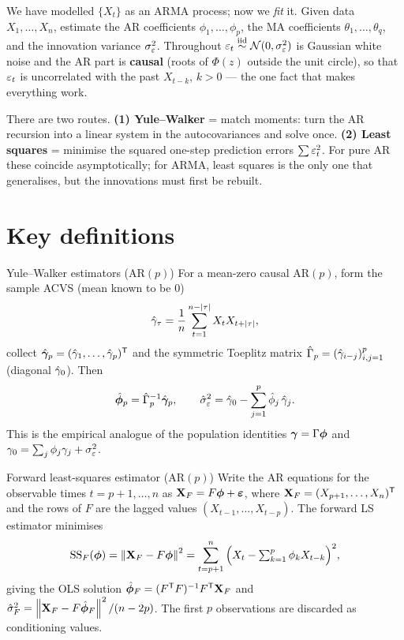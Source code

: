 \documentclass[11pt]{article}
\begin{document}

We have modelled $\{X_t\}$ as an ARMA process; now we \emph{fit} it. Given data $X_1,\dots,X_n$, estimate the AR coefficients $\phi_1,\dots,\phi_p$, the MA coefficients $\theta_1,\dots,\theta_q$, and the innovation variance $\sigma_\varepsilon^2$. Throughout $\varepsilon_t\overset{\text{iid}}{\sim}\mathcal N(0,\sigma_\varepsilon^2)$ is Gaussian white noise and the AR part is \textbf{causal} (roots of $\Phi(z)$ outside the unit circle), so that $\varepsilon_t$ is uncorrelated with the past $X_{t-k}$, $k>0$ --- the one fact that makes everything work.

\begin{intu}
There are two routes. \textbf{(1) Yule--Walker} = match moments: turn the AR recursion into a linear system in the autocovariances and solve once. \textbf{(2) Least squares} = minimise the squared one-step prediction errors $\sum\varepsilon_t^2$. For pure AR these coincide asymptotically; for ARMA, least squares is the only one that generalises, but the innovations must first be rebuilt.
\end{intu}

\section*{Key definitions}

\begin{defn}{Yule--Walker estimators (AR$(p)$)}
For a mean-zero causal AR$(p)$, form the sample ACVS (mean known to be $0$)
\[
\hat{\gamma}_\tau=\frac1n\sum_{t=1}^{n-\left\lvert \tau \right\rvert}X_tX_{t+\left\lvert \tau \right\rvert},
\]
collect $\hat{\bm{\gamma}}_p=(\hat{\gamma}_1,\dots,\hat{\gamma}_p)^{\mathsf{T}}$ and the symmetric Toeplitz matrix $\hat\Gamma_p=(\hat{\gamma}_{i-j})_{i,j=1}^p$ (diagonal $\hat{\gamma}_0$). Then
\[
\hat{\bm\phi}_p=\hat\Gamma_p^{-1}\hat{\bm{\gamma}}_p,
\qquad
\hat\sigma_\varepsilon^2=\hat{\gamma}_0-\sum_{j=1}^p\hat\phi_j\,\hat{\gamma}_j .
\]
This is the empirical analogue of the population identities $\bm{\gamma}=\Gamma\bm\phi$ and $\gamma_0=\sum_j\phi_j\gamma_j+\sigma_\varepsilon^2$.
\end{defn}

\begin{defn}{Forward least-squares estimator (AR$(p)$)}
Write the AR equations for the observable times $t=p+1,\dots,n$ as $\mathbf X_F=F\bm\phi+\bm{\varepsilon}$, where $\mathbf X_F=(X_{p+1},\dots,X_n)^{\mathsf{T}}$ and the rows of $F$ are the lagged values $(X_{t-1},\dots,X_{t-p})$. The forward LS estimator minimises
\[
\mathrm{SS}_F(\bm\phi)=\left\lVert \mathbf X_F-F\bm\phi \right\rVert^2
=\sum_{t=p+1}^n\Big(X_t-\textstyle\sum_{k=1}^p\phi_kX_{t-k}\Big)^2,
\]
giving the OLS solution $\hat{\bm\phi}_F=(F^{\mathsf{T}} F)^{-1}F^{\mathsf{T}}\mathbf X_F$ and $\hat\sigma_F^2=\left\lVert \mathbf X_F-F\hat{\bm\phi}_F \right\rVert^2/(n-2p)$. The first $p$ observations are discarded as conditioning values.
\end{defn}
\end{document}
